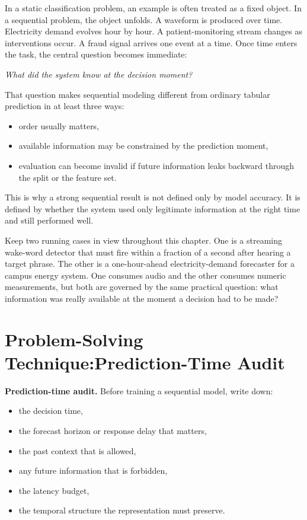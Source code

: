 In a static classification problem, an example is often treated as a fixed object. In a sequential problem, the object unfolds. A waveform is produced over time. Electricity demand evolves hour by hour. A patient-monitoring stream changes as interventions occur. A fraud signal arrives one event at a time. Once time enters the task, the central question becomes immediate:

\begin{center}
\emph{What did the system know at the decision moment?}
\end{center}

That question makes sequential modeling different from ordinary tabular prediction in at least three ways:
\begin{itemize}[leftmargin=*]
\item order usually matters,
\item available information may be constrained by the prediction moment,
\item evaluation can become invalid if future information leaks backward through the split or the feature set.
\end{itemize}

This is why a strong sequential result is not defined only by model accuracy. It is defined by whether the system used only legitimate information at the right time and still performed well.

Keep two running cases in view throughout this chapter. One is a streaming wake-word detector that must fire within a fraction of a second after hearing a target phrase. The other is a one-hour-ahead electricity-demand forecaster for a campus energy system. One consumes audio and the other consumes numeric measurements, but both are governed by the same practical question: what information was really available at the moment a decision had to be made?

\section[Problem-Solving Technique: Prediction-Time Audit]{Problem-Solving Technique:\linebreak Prediction-Time Audit}

\begin{thinkingtool}
\textbf{Prediction-time audit.} Before training a sequential model, write down:
\begin{itemize}[leftmargin=*]
\item the decision time,
\item the forecast horizon or response delay that matters,
\item the past context that is allowed,
\item any future information that is forbidden,
\item the latency budget,
\item the temporal structure the representation must preserve.
\end{itemize}
\end{thinkingtool}

